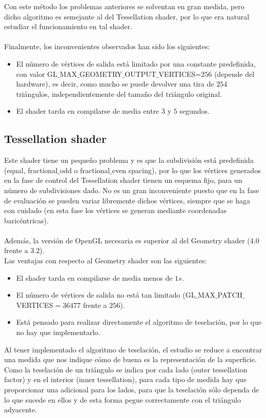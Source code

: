 	Con este método los problemas anteriores se solventan en gran medida, pero dicho algoritmo es semejante al del Tessellation shader, por lo que era natural estudiar el funcionamiento en tal shader.\\
	\\ Finalmente, los inconvenientes observados han sido los siguientes:
	\begin{itemize}
		\item El número de vértices de salida está limitado por una constante predefinida, con valor GL$\_$MAX$\_$GEOMETRY$\_$OUTPUT$\_$VERTICES=$256$ (depende del hardware), es decir, como mucho se puede devolver una tira de $254$ triángulos, independientemente del tamaño del triángulo original.
		\item El shader tarda en compilarse de media entre $3$ y $5$ segundos.
	\end{itemize}
	
\subsection*{Tessellation shader}

	Este shader tiene un pequeño problema y es que la subdivisión está predefinida (equal, fractional$\_$odd o fractional$\_$even spacing), por lo que los vértices generados en la fase de control del Tessellation shader tienen un esquema fijo, para un número de subdivisiones dado. No es un gran inconveniente puesto que en la fase de evaluación se pueden variar libremente dichos vértices, siempre que se haga con cuidado (en esta fase los vértices se generan mediante coordenadas baricéntricas). \\
	\\Además, la versión de OpenGL necesaria es superior al del Geometry shader ($4.0$ frente a $3.2$).
	\\ Las ventajas con respecto al Geometry shader son las siguientes:
	\begin{itemize}
		\item El shader tarda en compilarse de media menos de $1s$.
		\item El número de vértices de salida no está tan limitado (GL$\_$MAX$\_$PATCH$\_$VERTICES$=36477$ frente a $256$).
		\item Está pensado para realizar directamente el algoritmo de teselación, por lo que no hay que implementarlo.
	\end{itemize}
	
	Al tener implementado el algoritmo de teselación, el estudio se reduce a encontrar una medida que nos indique cómo de buena es la representación de la superficie. Como la teselación de un triángulo se indica por cada lado (outer tessellation factor) y en el interior (inner tessellation), para cada tipo de medida hay que proporcionar una adicional para los lados, para que la teselación sólo dependa de lo que sucede en ellos y de esta forma pegue correctamente con el triángulo adyacente.

